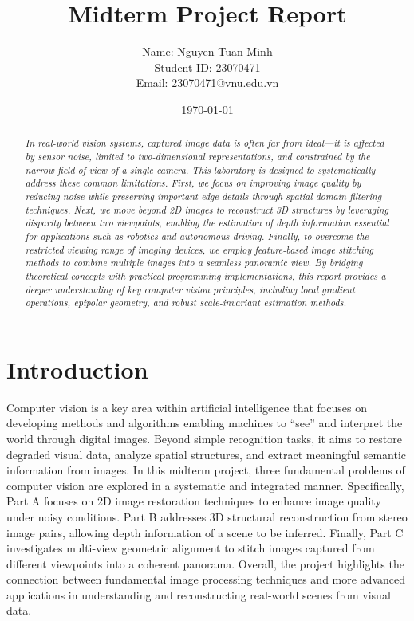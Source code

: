 \documentclass[a4paper,12pt]{article}
\begin{document}
\title{\textcolor{titleblue}{Midterm Project Report}}

\author{\parbox{0.6\linewidth}{\centering
Name: Nguyen Tuan Minh\\
Student ID: 23070471\\
Email: 23070471@vnu.edu.vn}}

\date{\today}


\maketitle

\begin{abstract}
\textit{In real-world vision systems, captured image data is often far from ideal—it is affected by sensor noise, limited to two-dimensional representations, and constrained by the narrow field of view of a single camera. This laboratory is designed to systematically address these common limitations. First, we focus on improving image quality by reducing noise while preserving important edge details through spatial-domain filtering techniques. Next, we move beyond 2D images to reconstruct 3D structures by leveraging disparity between two viewpoints, enabling the estimation of depth information essential for applications such as robotics and autonomous driving. Finally, to overcome the restricted viewing range of imaging devices, we employ feature-based image stitching methods to combine multiple images into a seamless panoramic view.
By bridging theoretical concepts with practical programming implementations, this report provides a deeper understanding of key computer vision principles, including local gradient operations, epipolar geometry, and robust scale-invariant estimation methods.}
\end{abstract}


\section{Introduction}

Computer vision is a key area within artificial intelligence that focuses on developing methods and algorithms enabling machines to “see” and interpret the world through digital images. Beyond simple recognition tasks, it aims to restore degraded visual data, analyze spatial structures, and extract meaningful semantic information from images. In this midterm project, three fundamental problems of computer vision are explored in a systematic and integrated manner. Specifically, Part A focuses on 2D image restoration techniques to enhance image quality under noisy conditions. Part B addresses 3D structural reconstruction from stereo image pairs, allowing depth information of a scene to be inferred. Finally, Part C investigates multi-view geometric alignment to stitch images captured from different viewpoints into a coherent panorama. Overall, the project highlights the connection between fundamental image processing techniques and more advanced applications in understanding and reconstructing real-world scenes from visual data.
\end{document}
